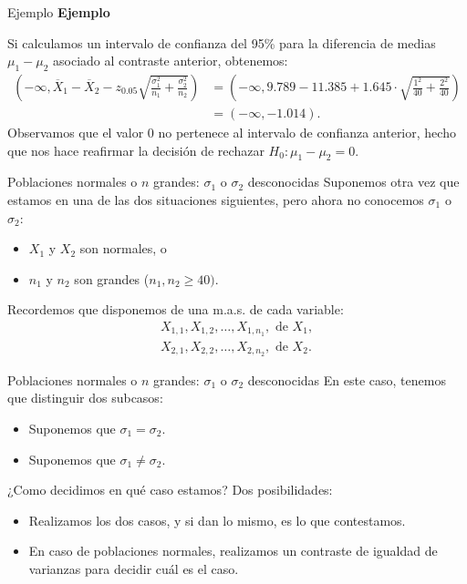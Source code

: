 \documentclass[
  ignorenonframetext,
]{beamer}
\providecommand{\tightlist}{%
  \setlength{\itemsep}{0pt}\setlength{\parskip}{0pt}}
\begin{document}
\begin{frame}{Ejemplo}
\protect\hypertarget{ejemplo-24}{}
\textbf{Ejemplo}

Si calculamos un intervalo de confianza del 95\% para la diferencia de
medias \(\mu_1-\mu_2\) asociado al contraste anterior, obtenemos: \[
\begin{array}{ll}
\left( -\infty, \overline{X}_1 -\overline{X}_2
-z_{0.05}\sqrt{\frac{\sigma_1^2}{n_1}+\frac{\sigma_2^2}{n_2}}\right)  & =  \left(-\infty,9.789-11.385 +1.645\cdot \sqrt{\frac{1^2}{40}+\frac{2^2}{40}}\right) \\  & =  (-\infty, -1.014).
\end{array}
\] Observamos que el valor \(0\) no pertenece al intervalo de confianza
anterior, hecho que nos hace reafirmar la decisión de rechazar
\(H_0:\mu_1-\mu_2=0\).
\end{frame}

\begin{frame}{Poblaciones normales o \(n\) grandes: \(\sigma_1\) o
\(\sigma_2\) desconocidas}
\protect\hypertarget{poblaciones-normales-o-n-grandes-sigma_1-o-sigma_2-desconocidas}{}
Suponemos otra vez que estamos en una de las dos situaciones siguientes,
pero ahora no conocemos \(\sigma_1\) o \(\sigma_2\):

\begin{itemize}[<+->]
\item
  \(X_1\) y \(X_2\) son normales, o
\item
  \(n_1\) y \(n_2\) son grandes (\(n_1,n_2\geq 40)\).
\end{itemize}

Recordemos que disponemos de una m.a.s. de cada variable: \[
\begin{array}{l}
X_{1,1}, X_{1,2},\ldots, X_{1,n_1},\mbox{ de }X_1,\\
X_{2,1}, X_{2,2},\ldots, X_{2,n_2},\mbox{ de }X_2.
\end{array}
\]
\end{frame}

\begin{frame}{Poblaciones normales o \(n\) grandes: \(\sigma_1\) o
\(\sigma_2\) desconocidas}
\protect\hypertarget{poblaciones-normales-o-n-grandes-sigma_1-o-sigma_2-desconocidas-1}{}
En este caso, tenemos que distinguir dos subcasos:

\begin{itemize}[<+->]
\tightlist
\item
  Suponemos que \(\sigma_1=\sigma_2\).
\item
  Suponemos que \(\sigma_1\neq \sigma_2\).
\end{itemize}

¿Como decidimos en qué caso estamos? Dos posibilidades:

\begin{itemize}[<+->]
\tightlist
\item
  Realizamos los dos casos, y si dan lo mismo, es lo que contestamos.
\item
  En caso de poblaciones normales, realizamos un contraste de igualdad
  de varianzas para decidir cuál es el caso.
\end{itemize}
\end{frame}
\end{document}
